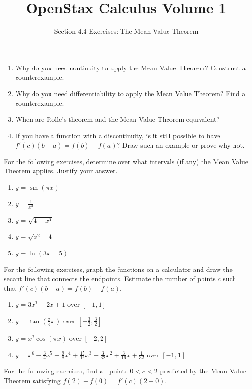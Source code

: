 \documentclass{exercises}
\title{OpenStax Calculus Volume 1}
\subtitle{Section 4.4 Exercises: The Mean Value Theorem}
\author{}
\date{}
\begin{document}
\maketitle

\begin{enumerate}[start=1]
\item Why do you need continuity to apply the Mean Value Theorem? Construct a counterexample.
\item Why do you need differentiability to apply the Mean Value Theorem? Find a counterexample.
\item When are Rolle's theorem and the Mean Value Theorem equivalent?
\item If you have a function with a discontinuity, is it still possible to have $f'(c)(b-a)=f(b)-f(a)$? Draw such an example or prove why not.
\end{enumerate}

For the following exercises, determine over what intervals (if any) the Mean Value Theorem applies. Justify your answer.

\begin{enumerate}[resume]
\item $y=\sin(\pi x)$
\item $y=\frac{1}{x^{3}}$
\item $y=\sqrt{4-x^{2}}$
\item $y=\sqrt{x^{2}-4}$
\item $y=\ln(3x-5)$
\end{enumerate}

For the following exercises, graph the functions on a calculator and draw the secant line that connects the endpoints. Estimate the number of points $c$ such that $f'(c)(b-a)=f(b)-f(a)$.

\begin{enumerate}[resume]
\item \techrequired $y=3x^{3}+2x+1$ over $[-1,1]$
\item \techrequired $y=\tan(\frac{\pi}{4}x)$ over $[-\frac{3}{2},\frac{3}{2}]$
\item \techrequired $y=x^{2}\cos(\pi x)$ over $[-2,2]$
\item \techrequired $y=x^{6}-\frac{3}{4}x^{5}-\frac{9}{8}x^{4}+\frac{15}{16}x^{3}+\frac{3}{32}x^{2}+\frac{3}{16}x+\frac{1}{32}$ over $[-1,1]$
\end{enumerate}

For the following exercises, find all points $0<c<2$ predicted by the Mean Value Theorem satisfying $f(2)-f(0)=f'(c)(2-0)$.
\end{document}
